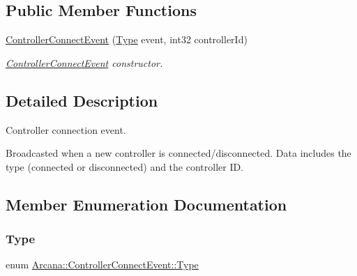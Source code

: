 \subsection*{Public Member Functions}
\begin{DoxyCompactItemize}
\item 
\mbox{\label{struct_arcana_1_1_controller_connect_event_aa55dc359bc98111360e073158ec28a68}} 
\mbox{\hyperlink{struct_arcana_1_1_controller_connect_event_aa55dc359bc98111360e073158ec28a68}{Controller\+Connect\+Event}} (\mbox{\hyperlink{struct_arcana_1_1_controller_connect_event_a13728f4573db87b8b2ef1fc5f9bebc38}{Type}} event, int32 controller\+Id)
\begin{DoxyCompactList}\small\item\em \mbox{\hyperlink{struct_arcana_1_1_controller_connect_event}{Controller\+Connect\+Event}} constructor. \end{DoxyCompactList}\end{DoxyCompactItemize}


\subsection{Detailed Description}
Controller connection event. 

Broadcasted when a new controller is connected/disconnected. Data includes the type (connected or disconnected) and the controller ID. 

\subsection{Member Enumeration Documentation}
\mbox{\label{struct_arcana_1_1_controller_connect_event_a13728f4573db87b8b2ef1fc5f9bebc38}} 
\subsubsection{\texorpdfstring{Type}{Type}}
{\footnotesize\ttfamily enum \mbox{\hyperlink{struct_arcana_1_1_controller_connect_event_a13728f4573db87b8b2ef1fc5f9bebc38}{Arcana\+::\+Controller\+Connect\+Event\+::\+Type}}}



